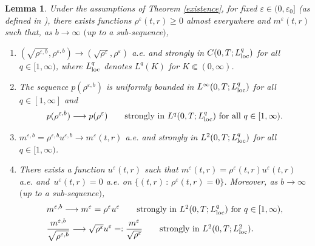 \documentclass[reqno,11pt]{amsart}
\numberwithin{equation}{section}
\newtheorem{lemma}[theorem]{Lemma}
\theoremstyle{definition}
\def\v{\varepsilon}
\begin{document}
\begin{lemma}\label{lem5.2}
Under the assumptions of {\rm Theorem {\rm \ref{existence}}}, for fixed $\v\in(0,\v_0]$
{\rm (}as defined in {\rm \cite[Lemma B.8]{Carrillo2025}}{\rm )}, there exists functions $\rho^{\v}(t,r)\ge 0$ almost everywhere
and $m^{\v}(t,r)$ such that, as $b\rightarrow\infty$ $($up to a sub-sequence$)$,
\begin{enumerate}
    \item[{\rm(a)}] 
    $
	(\sqrt{\rho^{\v,b}}, \rho^{\v,b})\longrightarrow (\sqrt{\rho^{\v}}, \rho^{\v})$  {\it a.e.} and strongly in  $C(0,T; L^q_{\rm loc})$ for all $q \in [1,\infty)$,
    where $L^q_{\rm loc}$ denotes  $L^q(K)$ for $K\Subset (0,\infty)$.

    \vspace{0.2cm}

    \item[{\rm(b)}] The sequence $p(\rho^{\v,b})$ is uniformly bounded in $L^\infty(0,T; L^q_{\rm loc})$ for all $q\in[1,\infty]$ and
    \begin{align*}
	p(\rho^{\v,b})\longrightarrow p(\rho^{\v}) \qquad  \mbox{strongly in $L^q(0,T; L^q_{\rm loc})$ for all $q\in[1,\infty)$}.
	\end{align*}

    \vspace{0.2cm}

    \item[{\rm(c)}] $ m^{\v,b}=\rho^{\v,b} u^{\v,b}\longrightarrow m^{\v}(t,r)$ {\it a.e.} and strongly in $L^2(0,T; L^q_{\rm loc})$ for all $q\in[1,\infty)$.

    \vspace{0.2cm}

    \item[{\rm(d)}]There exists
	a function $u^{\v}(t,r)$ such that $m^{\v}(t,r)=\rho^{\v}(t,r) u^{\v}(t,r)$ a.e. and $\,u^\v(t,r)=0$ a.e.
	on $\{(t,r)\,:\,\rho^{\v}(t,r)=0\}$. Moreover, as $b\rightarrow\infty$ $($up to a sub-sequence$)$,
	\begin{align*}
	& m^{\v,b} \longrightarrow m^{\v}=\rho^{\v} u^{\v} \qquad  \mbox{strongly in $L^2(0,T; L^q_{\rm loc})$ for $q\in[1,\infty)$},\\
	& \frac{m^{\v,b}}{\sqrt{\rho^{\v,b}}}\longrightarrow \sqrt{\rho^{\v}} u^{\v}=:\frac{m^\v}{\sqrt{\rho^\v}}
\qquad  \mbox{strongly in $L^2(0,T; L^2_{\rm loc})$}.
\end{align*}
\end{enumerate}
\end{lemma}
\end{document}
